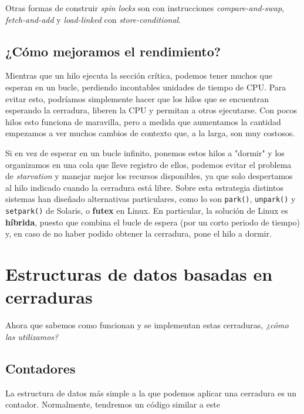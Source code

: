 \documentclass{article}
\begin{document}
	Otras formas de construir \textit{spin locks} son con instrucciones \textit{compare-and-swap}, \textit{fetch-and-add} y \textit{load-linked} con \textit{store-conditional}.
	
	\subsection{¿Cómo mejoramos el rendimiento?}
	Mientras que un hilo ejecuta la sección crítica, podemos tener muchos que esperan en un bucle, perdiendo incontables unidades de tiempo de CPU. Para evitar esto, podríamos simplemente hacer que los hilos que se encuentran esperando la cerradura, liberen la CPU y permitan a otros ejecutarse. Con pocos hilos esto funciona de maravilla, pero a medida que aumentamos la cantidad empezamos a ver muchos cambios de contexto que, a la larga, son muy costosos.
	
	Si en vez de esperar en un bucle infinito, ponemos estos hilos a "dormir" y los organizamos en una cola que lleve registro de ellos, podemos evitar el problema de \textit{starvation} y manejar mejor los recursos disponibles, ya que solo despertamos al hilo indicado cuando la cerradura está libre. Sobre esta estrategia distintos sistemas han diseñado alternativas particulares, como lo son \lstinline|park()|, \lstinline|unpark()| y \lstinline|setpark()| de Solaris, o  \textbf{futex} en Linux. En particular, la solución de Linux es \textbf{híbrida}, puesto que combina el bucle de espera (por un corto periodo de tiempo) y, en caso de no haber podido obtener la cerradura, pone el hilo a dormir.
	
	\section{Estructuras de datos basadas en cerraduras}
	Ahora que sabemos como funcionan y se implementan estas cerraduras, \textit{¿cómo las utilizamos?}
	
	\subsection{Contadores}
	
	La estructura de datos más simple a la que podemos aplicar una cerradura es un contador. Normalmente, tendremos un código similar a este
	
\end{document}
